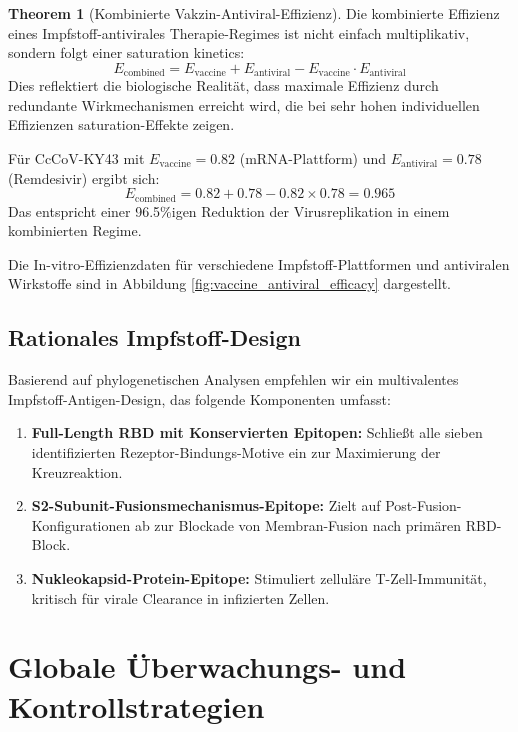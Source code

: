 ﻿\documentclass[11pt,a4paper]{article}
\theoremstyle{definition}
\newtheorem{theorem}{Theorem}[section]
\begin{document}
\begin{theorem}[Kombinierte Vakzin-Antiviral-Effizienz]
Die kombinierte Effizienz eines Impfstoff-antivirales Therapie-Regimes ist nicht einfach multiplikativ, sondern folgt einer saturation kinetics:
\[
E_{\text{combined}} = E_{\text{vaccine}} + E_{\text{antiviral}} - E_{\text{vaccine}} \cdot E_{\text{antiviral}}
\]
Dies reflektiert die biologische Realität, dass maximale Effizienz durch redundante Wirkmechanismen erreicht wird, die bei sehr hohen individuellen Effizienzen saturation-Effekte zeigen.

Für CcCoV-KY43 mit $E_{\text{vaccine}} = 0.82$ (mRNA-Plattform) und $E_{\text{antiviral}} = 0.78$ (Remdesivir) ergibt sich:
\[
E_{\text{combined}} = 0.82 + 0.78 - 0.82 \times 0.78 = 0.965
\]
Das entspricht einer 96.5\%igen Reduktion der Virusreplikation in einem kombinierten Regime.
\end{theorem}

Die In-vitro-Effizienzdaten für verschiedene Impfstoff-Plattformen und antiviralen Wirkstoffe sind in Abbildung \ref{fig:vaccine_antiviral_efficacy} dargestellt.

\subsection{Rationales Impfstoff-Design}

Basierend auf phylogenetischen Analysen empfehlen wir ein multivalentes Impfstoff-Antigen-Design, das folgende Komponenten umfasst:

\begin{enumerate}
\item \textbf{Full-Length RBD mit Konservierten Epitopen:} Schließt alle sieben identifizierten Rezeptor-Bindungs-Motive ein zur Maximierung der Kreuzreaktion.

\item \textbf{S2-Subunit-Fusionsmechanismus-Epitope:} Zielt auf Post-Fusion-Konfigurationen ab zur Blockade von Membran-Fusion nach primären RBD-Block.

\item \textbf{Nukleokapsid-Protein-Epitope:} Stimuliert zelluläre T-Zell-Immunität, kritisch für virale Clearance in infizierten Zellen.
\end{enumerate}

\section{Globale Überwachungs- und Kontrollstrategien}
\end{document}
